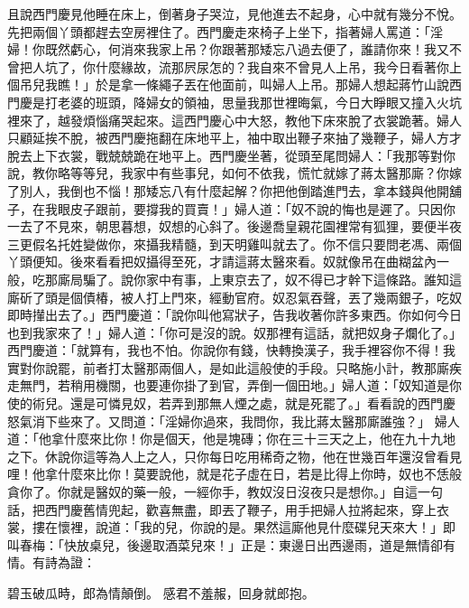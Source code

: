 且說西門慶見他睡在床上，倒著身子哭泣，見他進去不起身，心中就有幾分不悅。先把兩個丫頭都趕去空房裡住了。西門慶走來椅子上坐下，指著婦人罵道：「淫婦！你既然虧心，何消來我家上吊？你跟著那矮忘八過去便了，誰請你來！我又不曾把人坑了，你什麼緣故，流那屄尿怎的？我自來不曾見人上吊，我今日看著你上個吊兒我瞧！」於是拿一條繩子丟在他面前，叫婦人上吊。那婦人想起蔣竹山說西門慶是打老婆的班頭，降婦女的領袖，思量我那世裡晦氣，今日大睜眼又撞入火坑裡來了，越發煩惱痛哭起來。這西門慶心中大怒，教他下床來脫了衣裳跪著。婦人只顧延挨不脫，被西門慶拖翻在床地平上，袖中取出鞭子來抽了幾鞭子，婦人方才脫去上下衣裳，戰兢兢跪在地平上。西門慶坐著，從頭至尾問婦人：「我那等對你說，教你略等等兒，我家中有些事兒，如何不依我，慌忙就嫁了蔣太醫那廝？你嫁了別人，我倒也不惱！那矮忘八有什麼起解？你把他倒踏進門去，拿本錢與他開舖子，在我眼皮子跟前，要撐我的買賣！」婦人道：「奴不說的悔也是遲了。只因你一去了不見來，朝思暮想，奴想的心斜了。後邊喬皇親花園裡常有狐狸，要便半夜三更假名托姓變做你，來攝我精髓，到天明雞叫就去了。你不信只要問老馮、兩個丫頭便知。後來看看把奴攝得至死，才請這蔣太醫來看。奴就像吊在曲糊盆內一般，吃那廝局騙了。說你家中有事，上東京去了，奴不得已才幹下這條路。誰知這廝斫了頭是個債椿，被人打上門來，經動官府。奴忍氣吞聲，丟了幾兩銀子，吃奴即時攆出去了。」西門慶道：「說你叫他寫狀子，告我收著你許多東西。你如何今日也到我家來了！」婦人道：「你可是沒的說。奴那裡有這話，就把奴身子爛化了。」西門慶道：「就算有，我也不怕。你說你有錢，快轉換漢子，我手裡容你不得！我實對你說罷，前者打太醫那兩個人，是如此這般使的手段。只略施小計，教那廝疾走無門，若稍用機關，也要連你掛了到官，弄倒一個田地。」婦人道：「奴知道是你使的術兒。還是可憐見奴，若弄到那無人煙之處，就是死罷了。」看看說的西門慶怒氣消下些來了。又問道：「淫婦你過來，我問你，我比蔣太醫那廝誰強？」 婦人道：「他拿什麼來比你！你是個天，他是塊磚；你在三十三天之上，他在九十九地之下。休說你這等為人上之人，只你每日吃用稀奇之物，他在世幾百年還沒曾看見哩！他拿什麼來比你！莫要說他，就是花子虛在日，若是比得上你時，奴也不恁般貪你了。你就是醫奴的藥一般，一經你手，教奴沒日沒夜只是想你。」自這一句話，把西門慶舊情兜起，歡喜無盡，即丟了鞭子，用手把婦人拉將起來，穿上衣裳，摟在懷裡，說道：「我的兒，你說的是。果然這廝他見什麼碟兒天來大！」即叫春梅：「快放桌兒，後邊取酒菜兒來！」正是：東邊日出西邊雨，道是無情卻有情。有詩為證：

碧玉破瓜時，郎為情顛倒。
感君不羞赧，回身就郎抱。

